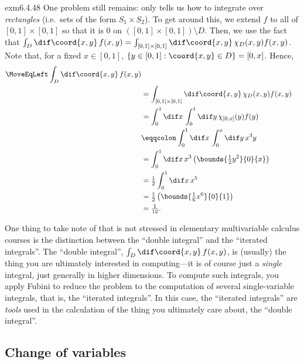 \begin{exm}{}{exm6.4.48}
One problem still remains:   only tells us how to integrate over \emph{rectangles} (i.e.~sets of the form $S_1\times S_2$).  To get around this, we extend $f$ to all of $[0,1]\times [0,1]$ so that it is $0$ on $([0,1]\times [0,1])\setminus D$.  Then, we use the fact that $\int _D\dif \coord{x,y}\, f(x,y)=\int _{[0,1]\times [0,1]}\dif \coord{x,y}\, \chi _D(x,y)f(x,y)$.  Note that, for a fixed $x\in [0,1]$, $\left\{ y\in [0,1]:\coord{x,y}\in D\right\} =[0,x]$.  Hence,
\begin{equation}
\begin{split}
\MoveEqLeft
\int _D\dif \coord{x,y}\, f(x,y) \\
& =\int _{[0,1]\times [0,1]}\dif \coord{x,y}\, \chi _D(x,y)f(x,y) \\
& =\int _0^1\dif x\, \int _0^1\dif y\, \chi _{[0,x]}(y)f(y) \\
& \eqqcolon \int _0^1\dif x\, \int _0^x\dif y\, x^3y \\
& =\int _0^1\dif x\, x^3\left( \bounds{\tfrac{1}{2}y^2}{0}{x}\right) \\
& =\tfrac{1}{2}\int _0^1\dif x\, x^5 \\
& =\tfrac{1}{2}\left( \bounds{\tfrac{1}{6}x^6}{0}{1}\right) \\
& =\tfrac{1}{12}.
\end{split}
\end{equation}
\begin{rmk}
One thing to take note of that is not stressed in elementary multivariable calculus courses is the distinction between the ``double integral'' and the ``iterated integrals''.  The ``double integral'', $\int _D\dif \coord{x,y}\, f(x,y)$, is (usually) the thing you are ultimately interested in computing---it is of course just a \emph{single} integral, just generally in higher dimensions.  To compute such integrals, you apply Fubini to reduce the problem to the computation of several single-variable integrals, that is, the ``iterated integrals''.  In this case, the ``iterated integrals'' are \emph{tools} used in the calculation of the thing you ultimately care about, the ``double integral''.
\end{rmk}
\end{exm}

\subsection{Change of variables}


